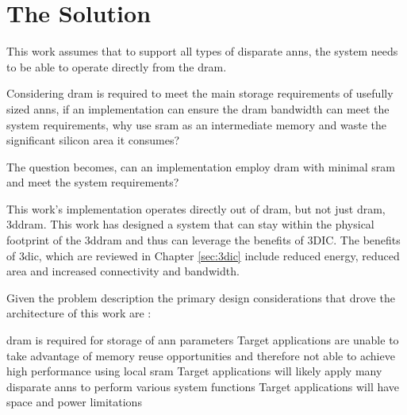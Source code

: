 
\section[The Solution]{The Solution}
\label{sec:The Solution}

This work assumes that to support all types of disparate \ac{ann}s, the system needs to be able to operate directly from the \ac{dram}.
\iffalse 
This is because SRAM-based solutions assume memory reuse when processing a \ac{ann}.
However, when \ac{ann}s do not provide sufficient reuse these solutions become \ac{dram} bandwidth bound. 
\fi

Considering \ac{dram} is required to meet the main storage requirements of usefully sized \ac{ann}s, if an implementation can ensure the \ac{dram} bandwidth can meet the system requirements, why use \ac{sram} as an intermediate memory and waste the significant silicon area it consumes?

The question becomes, can an implementation employ \ac{dram} with minimal \ac{sram} and meet the system requirements?

This work's implementation operates directly out of \ac{dram}, but not just \ac{dram}, \ac{3ddram}.
This work has designed a system that can stay within the physical footprint of the \ac{3ddram} and thus can leverage the benefits of 3DIC.
The benefits of \ac{3dic}, which are reviewed in Chapter \ref{sec:3dic} include reduced energy, reduced area and increased connectivity and bandwidth.

\iffalse
Therefore, this work is able to propose a custom 3D-\ac{dram} that exposes more of the \ac{dram}s internal page and thus generates interface bandwidth that is on the order of 64 times that of the standard \ac{3ddram}.
\fi

Given the problem description \iffalse outlined in Section \ref{sec:The Problem},\fi the primary design considerations that drove the architecture of this work are :
\begin{outline}
  \1 \ac{dram} is required for storage of \ac{ann} parameters 
  \1 Target applications are unable to take advantage of memory reuse opportunities and therefore not able to achieve high performance using local \ac{sram} \iffalse to store \ac{ann} parameters or the \ac{ann} input \fi
  \1 Target applications will likely apply many disparate \acp{ann} to perform various system functions
  \1 Target applications will have space and power limitations
\end{outline}

